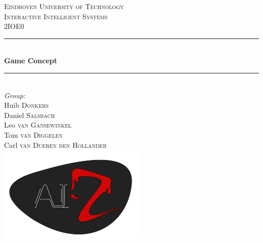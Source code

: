 \documentclass[12pt]{report}
\begin{document}
\begin{titlepage}

\newcommand{\HRule}{\rule{\linewidth}{0.5mm}} %

\center %
 

\textsc{\LARGE Eindhoven University of Technology}\\[1.5cm] %
\textsc{\Large Interactive Intelligent Systems}\\[0.5cm] %
\textsc{\large 2IOE0}\\[0.5cm] %


\HRule \\[0.4cm]
{ \huge \bfseries Game Concept}\\[0.4cm] %
\HRule \\[1.5cm]
 

\Large \emph{Group:}\\
Huib \textsc{Donkers}\\ %
Daniel \textsc{Salsbach}\\ %
Leo \textsc{van Gansewinkel}\\ %
Tom \textsc{van Diggelen}\\ %
Carl \textsc{van Dueren den Hollander}\\[.25cm] %


\includegraphics[width=7cm]{AIZlogo.png}\\[.25cm] %
 

\end{titlepage}
\end{document}
